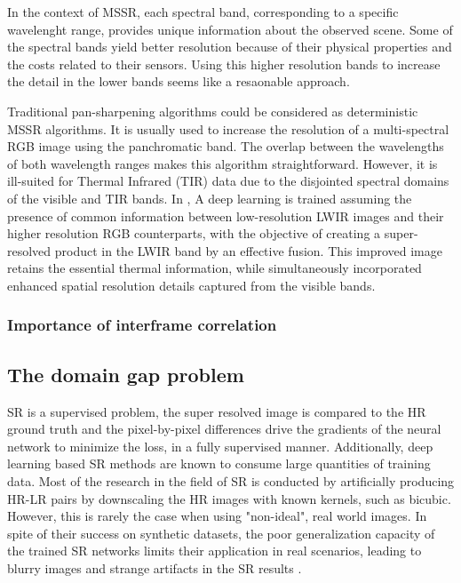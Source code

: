         In the context of MSSR, each spectral band, corresponding to a specific wavelenght range, provides unique information about the observed scene. Some of the spectral bands yield better resolution because of their physical properties and the costs related to their sensors. Using this higher resolution bands to increase the detail in the lower bands seems like a resaonable approach.

        Traditional pan-sharpening algorithms could be considered as deterministic MSSR  algorithms. It is usually used to increase the resolution of a multi-spectral RGB image using the panchromatic band. The overlap between the wavelengths of both wavelength ranges makes this algorithm straightforward. However, it is ill-suited for Thermal Infrared (TIR) data due to the disjointed spectral domains of the visible and TIR bands. In \cite{myself2023}, A deep learning is trained assuming the presence of common information between low-resolution LWIR images and their higher resolution RGB counterparts, with the objective of creating a super-resolved product in the LWIR band by an effective fusion. This improved image retains the essential thermal information, while simultaneously incorporated enhanced spatial resolution details captured from the visible bands. 

        \subsubsection{Importance of interframe correlation}
    \subsection{The domain gap problem} \label{subsec:domaingap}
 
        SR is a supervised problem, the super resolved image is compared to the HR ground truth and the pixel-by-pixel differences drive the gradients of the neural network to minimize the loss, in a fully supervised manner. 
        Additionally, deep learning based SR methods are known to consume large quantities of training data.
        Most of the research in the field of SR is conducted by artificially producing HR-LR pairs by downscaling the HR images with known kernels, such as bicubic.
        However, this is rarely the case when using "non-ideal", real world images.
        In spite of their success on synthetic datasets, the poor generalization capacity of the trained SR networks limits their application in real scenarios, leading to blurry images and strange artifacts in the SR results \cite{lugmayr2020ntire}.




